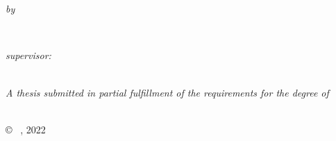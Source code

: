 \begin{titlepage}
    \begin{center}
        
        \HRule \\[0.4cm] %
        {\huge \bfseries \ttitle\par}\vspace{0.4cm} %
        \HRule \\[1.5cm] %

        \begin{minipage}[t]{0.4\textwidth}
            \begin{center} \large
                \large \emph{by} \\
                \LARGE \href{https://github.com/uduse/}{\authorname} %
            \end{center}
        \end{minipage} \\[2cm]
        

        \begin{minipage}[t]{0.4\textwidth}
            \begin{center} \large
                \emph{supervisor:} \\
                \LARGE \href{https://webdocs.cs.ualberta.ca/~mmueller/}{\supname}
            \end{center}
        \end{minipage}\\[2cm]
        

        \large \textit{A thesis submitted in partial fulfillment of the requirements for the degree of }
        \\[0.3cm]
        \LARGE \degreename \\[3cm]

        {\LARGE \deptname} \par
        {\LARGE \univname \par}\vspace{1.0cm}

        \vfill

        {\large \copyright ~ \authorname, 2022}\\[3cm] %

        \vfill
    \end{center}
\end{titlepage}